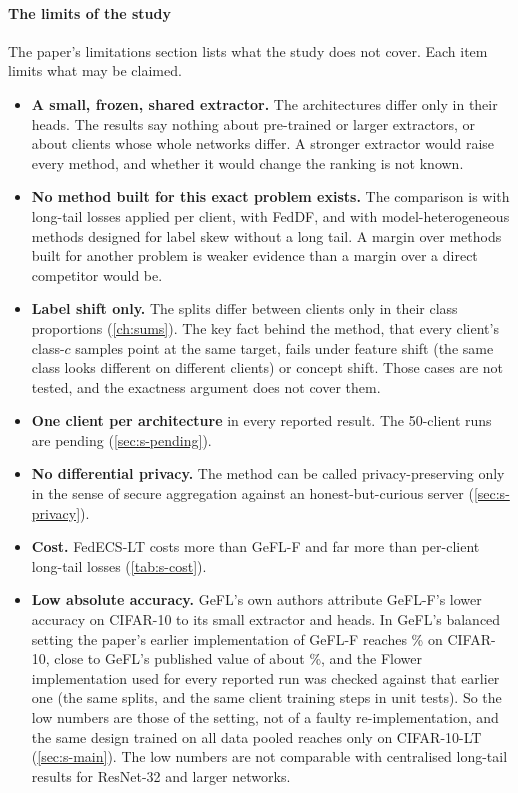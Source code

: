 \paragraph{The limits of the study} The paper's limitations section lists what the study does not cover. Each item
limits what may be claimed.
\begin{itemize}
\item \textbf{A small, frozen, shared extractor.} The architectures differ only in their heads. The results say
nothing about pre-trained or larger extractors, or about clients whose whole networks differ. A stronger extractor
would raise every method, and whether it would change the ranking is not known.
\item \textbf{No method built for this exact problem exists.} The comparison is with long-tail losses applied per
client, with FedDF, and with model-heterogeneous methods designed for label skew without a long tail. A margin over
methods built for another problem is weaker evidence than a margin over a direct competitor would be.
\item \textbf{Label shift only.} The splits differ between clients only in their class proportions
(\cref{ch:sums}). The key fact behind the method, that every client's class-$c$ samples point at the same target,
fails under feature shift (the same class looks different on different clients) or concept shift. Those cases are not
tested, and the exactness argument does not cover them.
\item \textbf{One client per architecture} in every reported result. The 50-client runs are pending
(\cref{sec:s-pending}).
\item \textbf{No differential privacy.} The method can be called privacy-preserving only in the sense of secure
aggregation against an honest-but-curious server (\cref{sec:s-privacy}).
\item \textbf{Cost.} FedECS-LT costs more than GeFL-F and far more than per-client long-tail losses
(\cref{tab:s-cost}).
\item \textbf{Low absolute accuracy.} GeFL's own authors attribute GeFL-F's lower accuracy on CIFAR-10 to its small
extractor and heads. In GeFL's balanced setting the paper's earlier implementation of GeFL-F reaches
\% on CIFAR-10, close to GeFL's published value of about \%,
and the Flower implementation used for every reported run was checked against that earlier one (the same splits, and
the same client training steps in unit tests). So the low numbers are those of the setting, not of a faulty
re-implementation, and the same design trained on all data pooled reaches only
 on CIFAR-10-LT (\cref{sec:s-main}). The low numbers are not comparable with
centralised long-tail results for ResNet-32 and larger networks.
\end{itemize}

